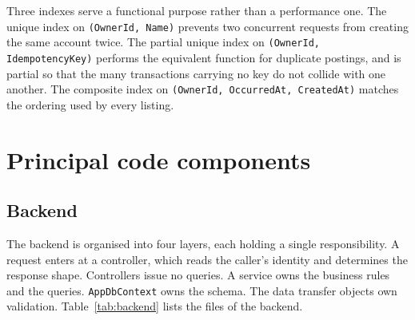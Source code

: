 \documentclass[11pt,a4paper]{article}
\newcommand{\code}[1]{\texttt{\fontsize{8.6}{10}\selectfont #1}}
\begin{document}
Three indexes serve a functional purpose rather than a performance one. The
unique index on \code{(OwnerId, Name)} prevents two concurrent requests from
creating the same account twice. The partial unique index on
\code{(OwnerId, IdempotencyKey)} performs the equivalent function for duplicate
postings, and is partial so that the many transactions carrying no key do not
collide with one another. The composite index on
\code{(OwnerId, OccurredAt, CreatedAt)} matches the ordering used by every
listing.

\section{Principal code components}

\subsection{Backend}

The backend is organised into four layers, each holding a single
responsibility. A request enters at a controller, which reads the caller's
identity and determines the response shape. Controllers issue no queries. A
service owns the business rules and the queries. \code{AppDbContext} owns the
schema. The data transfer objects own validation. Table~\ref{tab:backend}
lists the files of the backend.
\end{document}
